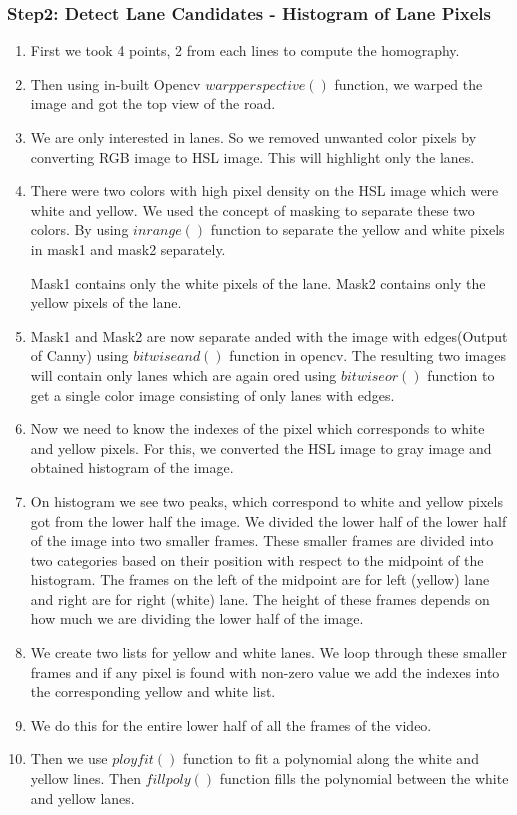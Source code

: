 \documentclass[12pt]{article}
\begin{document}
\subsubsection{Step2: Detect Lane Candidates - Histogram of Lane Pixels}
\begin{enumerate}
\item First we took 4 points, 2  from each lines to compute the homography.

\item Then using in-built Opencv $warpperspective()$ function, we warped the image and got the top view of the road.

\item We are only interested in lanes. So we removed unwanted color pixels by converting RGB image to HSL image. This will highlight only the lanes.

\item There were two colors with high pixel density on the HSL image which were white and yellow. We used the concept of masking to separate these two colors. By using $inrange()$ function to separate the yellow and white pixels in mask1 and mask2 separately.

Mask1 contains only the white pixels of the lane.
Mask2 contains only the yellow pixels of the lane.

\item Mask1 and Mask2 are now separate anded with the image with edges(Output of Canny) using $bitwiseand()$ function in opencv. The resulting two images will contain only lanes which are again ored using $bitwiseor()$ function to get a single color image consisting of only lanes with edges. 

\item Now we need to know the indexes of the pixel which corresponds to white and yellow pixels. For this, we converted the HSL image to gray image and obtained histogram of the image.

\item On histogram we see two peaks, which correspond to white and yellow pixels got from the lower half the image. We divided the lower half of the lower half of the image into two smaller frames. These smaller frames are divided into two categories based on their position with respect to the midpoint of the histogram. The frames on the left of the midpoint are for left (yellow) lane and right are for right (white) lane. The height of these frames depends on how much we are dividing the lower half of the image.

\item We create two lists for yellow and white lanes. We loop through these smaller frames and if any pixel is found with non-zero value we add the indexes into the corresponding yellow and white list.

\item We do this for the entire lower half of all the frames of the video.

\item Then we use $ployfit()$ function to fit a polynomial along the white and yellow lines. Then $fillpoly()$ function fills the polynomial between the white and yellow lanes.

\end{enumerate}
\end{document}
